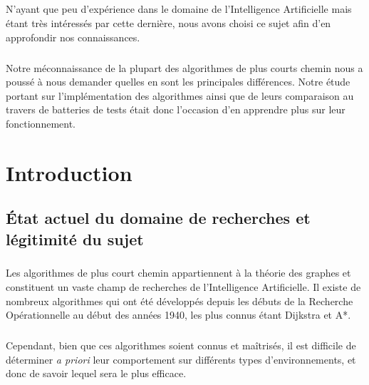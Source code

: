 \documentclass[pidr]{tnreport}
\begin{document}
\paragraph{}
N'ayant que peu d'expérience dans le domaine de l'Intelligence Artificielle mais étant très intéressés par cette dernière, nous avons choisi ce sujet afin d'en approfondir nos connaissances. 

\paragraph{}
Notre méconnaissance de la plupart des algorithmes de plus courts chemin nous a poussé à nous demander quelles en sont les principales différences. Notre étude portant sur l'implémentation des algorithmes ainsi que de leurs comparaison au travers de batteries de tests était donc l'occasion d'en apprendre plus sur leur fonctionnement.

\clearpage

\renewcommand{\baselinestretch}{0.5}\normalsize
\tableofcontents
\renewcommand{\baselinestretch}{1.0}\normalsize
\clearpage

\setcounter{page}{1}

\chapter{Introduction}

	\section{État actuel du domaine de recherches et légitimité du sujet}

\paragraph{}
Les algorithmes de plus court chemin appartiennent à la théorie des graphes et constituent un vaste champ de recherches de l'Intelligence Artificielle. Il existe de nombreux algorithmes qui ont été développés depuis les débuts de la Recherche Opérationnelle au début des années 1940, les plus connus étant Dijkstra et A*.

\paragraph{}
Cependant, bien que ces algorithmes soient connus et maîtrisés, il est difficile de déterminer \textit{a priori} leur comportement sur différents types d'environnements, et donc de savoir lequel sera le plus efficace. \linebreak
\end{document}
